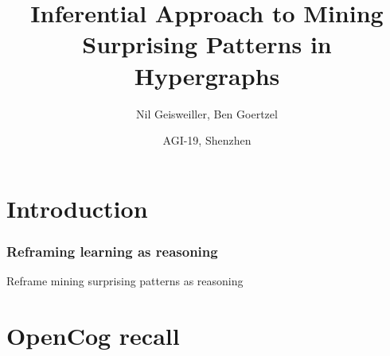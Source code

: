 \documentclass{beamer}
\title{Inferential Approach to Mining Surprising Patterns in
  Hypergraphs}
\author{Nil Geisweiller, Ben Goertzel}
\institute[SingularityNET OpenCog Foundations] %
{
  \begin{center}
    \texttt{[image: images/snet\_oc.png]}
  \end{center}
}
\date[AGI-19] %
{AGI-19, Shenzhen}
\begin{document}
\frame
{
  \maketitle






}


\section{Introduction}

\begin{frame}
  \frametitle{Reframing \alert{learning as reasoning}}




  
\end{frame}

\begin{frame}
  Reframe \alert{mining surprising patterns} as \alert{reasoning}
\end{frame}

\section{OpenCog recall}

\
\end{document}
